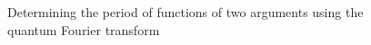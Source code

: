 \begin{figure}
\centering



\caption{Determining the period of functions of two arguments using the quantum Fourier transform}
\label{figQuantCompQuantPeriodFinding2}
\end{figure}